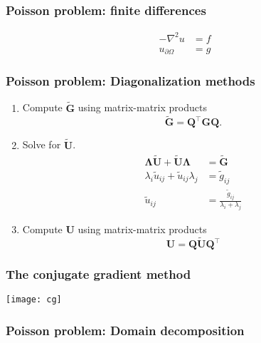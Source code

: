 \begin{frame}
  \frametitle{Poisson problem: finite differences}
  \[
    \begin{split}
      -\nabla^2 u &= f \\
      u_{\partial\Omega} &= g
    \end{split}
  \]
  \begin{center}
    \scalebox{0.8}{
      
    }
  \end{center}
\end{frame}

\begin{frame}
  \frametitle{Poisson problem: Diagonalization methods}
  \begin{enumerate}
  \item Compute $\tilde{\bm G}$ using matrix-matrix products
    \begin{equation*}
      \tilde{\bm G} = \bm Q^\intercal \bm G \bm Q.
    \end{equation*}
  \item Solve for $\tilde{\bm U}$.
    \begin{align*}
      \bm \Lambda \tilde{\bm U} + \tilde{\bm U} \bm \Lambda &= \tilde{\bm G} \\
      \lambda_i \tilde{u}_{ij} + \tilde{u}_{ij} \lambda_j &= \tilde{g}_{ij} \\
      \tilde{u}_{ij} &= \frac{\tilde{g}_{ij}}{\lambda_i + \lambda_j}
    \end{align*}
  \item Compute $\bm U$ using matrix-matrix products
    \begin{equation*}
      \bm U = \bm Q \tilde{\bm U} \bm Q^\intercal
    \end{equation*}
  \end{enumerate}
\end{frame}

\begin{frame}
  \frametitle{The conjugate gradient method}
  \begin{center}
    \texttt{[image: cg]}
  \end{center}
\end{frame}

\begin{frame}
  \frametitle{Poisson problem: Domain decomposition}
  \begin{center}
  \end{center}
\end{frame}


